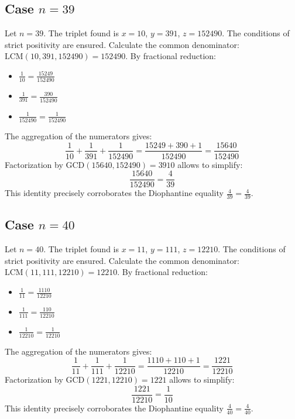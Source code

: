 \documentclass[11pt,a4paper]{article}
\begin{document}
\subsection{Case $n = 39$}
Let $n = 39$. The triplet found is $x = 10$, $y = 391$, $z = 152490$.
The conditions of strict positivity are ensured.
Calculate the common denominator: $\text{LCM}(10, 391, 152490) = 152490$.
By fractional reduction:
\begin{itemize}
    \item $\frac{1}{10} = \frac{15249}{152490}$
    \item $\frac{1}{391} = \frac{390}{152490}$
    \item $\frac{1}{152490} = \frac{1}{152490}$
\end{itemize}
The aggregation of the numerators gives:
$$ \frac{1}{10} + \frac{1}{391} + \frac{1}{152490} = \frac{15249 + 390 + 1}{152490} = \frac{15640}{152490} $$
Factorization by $\text{GCD}(15640, 152490) = 3910$ allows to simplify:
$$ \frac{15640}{152490} = \frac{4}{39} $$
This identity precisely corroborates the Diophantine equality $\frac{4}{39} = \frac{4}{39}$.

\subsection{Case $n = 40$}
Let $n = 40$. The triplet found is $x = 11$, $y = 111$, $z = 12210$.
The conditions of strict positivity are ensured.
Calculate the common denominator: $\text{LCM}(11, 111, 12210) = 12210$.
By fractional reduction:
\begin{itemize}
    \item $\frac{1}{11} = \frac{1110}{12210}$
    \item $\frac{1}{111} = \frac{110}{12210}$
    \item $\frac{1}{12210} = \frac{1}{12210}$
\end{itemize}
The aggregation of the numerators gives:
$$ \frac{1}{11} + \frac{1}{111} + \frac{1}{12210} = \frac{1110 + 110 + 1}{12210} = \frac{1221}{12210} $$
Factorization by $\text{GCD}(1221, 12210) = 1221$ allows to simplify:
$$ \frac{1221}{12210} = \frac{1}{10} $$
This identity precisely corroborates the Diophantine equality $\frac{4}{40} = \frac{4}{40}$.
\end{document}
